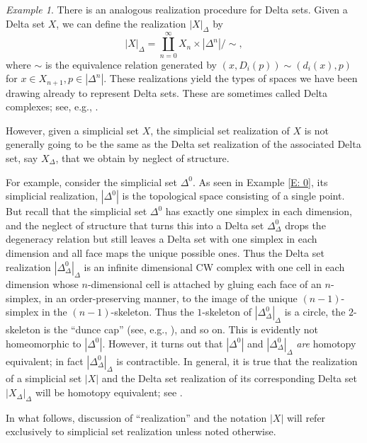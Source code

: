 \documentclass[12pt]{article}
\theoremstyle{plain}
\theoremstyle{definition}
\theoremstyle{remark}
\newtheorem{example}[theorem]{Example}
\begin{document}
\begin{example}
There is an analogous realization procedure for Delta sets. Given a Delta set $X$, we can define
the realization $|X|_{\Delta}$ by $$|X|_{\Delta}=\displaystyle\coprod_{n=0}^\infty X_n\times |\Delta^n|/\sim,$$
where $\sim$ is the equivalence relation generated by $(x,D_i(p))\sim(d_i(x),p)$ for $x\in X_{n+1}, p\in |\Delta^n|$. These realizations yield the types of spaces we have been drawing already to represent Delta sets. These are sometimes called Delta complexes; see, e.g., \cite{Ha}.

However, given a simplicial set $X$, the simplicial set realization of  $X$ is not generally going to be the same as the Delta set realization of the associated Delta set, say $X_{\Delta}$, that we obtain by neglect of structure. 

For example, consider the simplicial set $\Delta^0$. As seen in Example \ref{E: 0}, its simplicial realization, $|\Delta^0|$ is the topological space consisting of a single point. But recall that the simplicial set $\Delta^0$ has exactly one simplex in each dimension, and the neglect of structure that turns this into a Delta set $\Delta^0_\Delta$ drops the degeneracy relation but still leaves a Delta set with one simplex in each dimension and all face maps the unique possible ones. Thus the Delta set realization  $|\Delta^0_{\Delta}|_{\Delta}$ is an infinite dimensional CW complex with one cell in each dimension whose $n$-dimensional cell is attached by gluing each face of an $n$-simplex, in an order-preserving manner,   to the image of the unique $(n-1)$-simplex in the $(n-1)$-skeleton. Thus the $1$-skeleton of $|\Delta^0_{\Delta}|_{\Delta}$ is a circle, the $2$-skeleton is the ``dunce cap'' (see, e.g., \cite[Section 14]{BRTG}), and so on. This is evidently not homeomorphic to $|\Delta^0|$. However, it turns out that $|\Delta^0|$ and $|\Delta^0_{\Delta}|_{\Delta}$ \emph{are} homotopy equivalent; in fact $|\Delta^0_{\Delta}|_{\Delta}$ is contractible. In general, it is true that the realization of a simplicial set $|X|$ and the Delta set realization of its corresponding Delta set $|X_\Delta|_\Delta$  will be homotopy equivalent; see \cite{RSDelta}.


In what follows, discussion of ``realization'' and the notation $|X|$ will refer exclusively to simplicial set realization unless noted otherwise.
\end{example}
\end{document}
